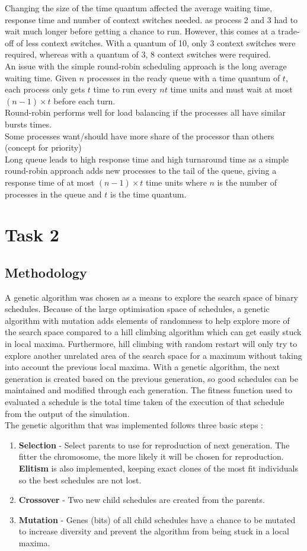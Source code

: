 \documentclass{article}
\newcommand{\n}[0]{\\[\baselineskip]}
\begin{document}
 
Changing the size of the time quantum affected the average waiting time, response time and number of context switches needed. as process 2 and 3 had to wait much longer before getting a chance to run. However, this comes at a trade-off of less context switches. With a quantum of 10, only 3 context switches were required, whereas with a quantum of 3, 8 context switches were required. 
\n
An issue with the simple round-robin scheduling approach is the long average waiting time. Given $n$ processes in the ready queue with a time quantum of $t$, each process only gets $t$ time to run every $nt$ time units and must wait at most $(n - 1) \times t$ before each turn. 
\n
Round-robin performs well for load balancing if the processes all have similar bursts times. 
\n
Some processes want/should have more share of the processor than others (concept for priority)
\n
Long queue leads to high response time and high turnaround time as a simple round-robin approach adds new processes to the tail of the queue, giving a response time of at most $(n - 1) \times t$ time units where $n$ is the number of processes in the queue and $t$ is the time quantum.
\section{Task 2}

\subsection{Methodology}
A genetic algorithm was chosen as a means to explore the search space of binary schedules. Because of the large optimisation space of schedules, a genetic algorithm with mutation adds elements of randomness to help explore more of the search space compared to a hill climbing algorithm which can get easily stuck in local maxima. Furthermore, hill climbing with random restart will only try to explore another unrelated area of the search space for a maximum without taking into account the previous local maxima. With a genetic algorithm, the next generation is created based on the previous generation, so good schedules can be maintained and modified through each generation. The fitness function used to evaluated a schedule is the total time taken of the execution of that schedule from the output of the simulation.
\n
The genetic algorithm that was implemented follows three basic steps \cite{ga}:
\begin{enumerate}
\item \textbf{Selection} - Select parents to use for reproduction of next generation. The fitter the chromosome, the more likely it will be chosen for reproduction. \textbf{Elitism} is also implemented, keeping exact clones of the most fit individuals so the best schedules are not lost.
\item \textbf{Crossover} - Two new child schedules are created from the parents.
\item \textbf{Mutation} - Genes (bits) of all child schedules have a chance to be mutated to increase diversity and prevent the algorithm from being stuck in a local maxima.
\end{enumerate}
\end{document}
